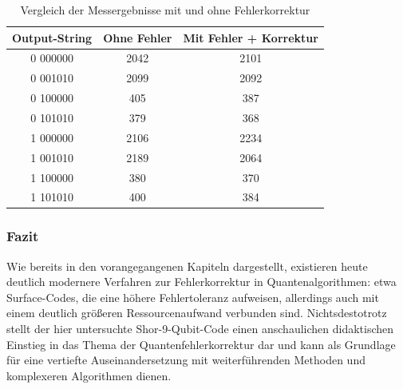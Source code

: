 \begin{table}[h!]
\centering
\begin{tabular}{|c|c|c|}
\hline
\textbf{Output-String} & \textbf{Ohne Fehler} & \textbf{Mit Fehler + Korrektur} \\
\hline
0 000000 & 2042 & 2101 \\
0 001010 & 2099 & 2092 \\
0 100000 & 405  & 387  \\
0 101010 & 379  & 368  \\
1 000000 & 2106 & 2234 \\
1 001010 & 2189 & 2064 \\
1 100000 & 380  & 370  \\
1 101010 & 400  & 384  \\
\hline
\end{tabular}
\caption{Vergleich der Messergebnisse mit und ohne Fehlerkorrektur}
\label{tab:shor_correction}
\end{table}



\subsubsection{Fazit}
Wie bereits in den vorangegangenen Kapiteln dargestellt, existieren heute deutlich modernere Verfahren zur Fehlerkorrektur in Quantenalgorithmen: etwa Surface-Codes, die eine höhere Fehlertoleranz aufweisen, allerdings auch mit einem deutlich größeren Ressourcenaufwand verbunden sind.
Nichtsdestotrotz stellt der hier untersuchte Shor-9-Qubit-Code einen anschaulichen didaktischen Einstieg in das Thema der Quantenfehlerkorrektur dar und kann als Grundlage für eine vertiefte Auseinandersetzung mit weiterführenden Methoden und komplexeren Algorithmen dienen.

\newpage
\printbibliography
